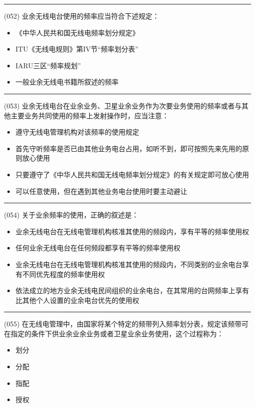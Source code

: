 \documentclass[twocolumn]{ctexart}  %
\begin{document}
\noindent\rule{0.5\textwidth}{1pt}
\heiti (052) 业余无线电台使用的频率应当符合下述规定： \songti {\color{gray} [LK0047] }
\begin{itemize}
	\item  《中华人民共和国无线电频率划分规定》
	\item  ITU《无线电规则》第IV节“频率划分表”
	\item  IARU三区“频率规划”
	\item  一般业余无线电书籍所叙述的频率
\end{itemize}


\noindent\rule{0.5\textwidth}{1pt}
\heiti (053) 业余无线电台在业余业务、卫星业余业务作为次要业务使用的频率或者与其他主要业务共同使用的频率上发射操作时，应当注意： \songti {\color{gray} [LK0048] }
\begin{itemize}
	\item  遵守无线电管理机构对该频率的使用规定
	\item  首先守听频率是否已由其他业务电台占用，如听不到，即可按照先来先用的原则放心使用
	\item  只要遵守了《中华人民共和国无线电频率划分规定》的有关规定即可放心使用
	\item  可以任意使用，但在遇到其他业务电台使用时要主动避让
\end{itemize}


\noindent\rule{0.5\textwidth}{1pt}
\heiti (054) 关于业余频率的使用，正确的叙述是： \songti {\color{gray} [LK0049] }
\begin{itemize}
	\item  业余无线电台在无线电管理机构核准其使用的频段内，享有平等的频率使用权
	\item  任何业余无线电台在任何频段都享有平等的频率使用权
	\item  业余无线电台在无线电管理机构核准其使用的频段内，不同类别的业余电台享有不同优先程度的频率使用权
	\item  依法成立的地方业余无线电民间组织的业余电台，在其常用的台网频率上享有比其他个人设置的业余电台优先的使用权
\end{itemize}


\noindent\rule{0.5\textwidth}{1pt}
\heiti (055) 在无线电管理中，由国家将某个特定的频带列入频率划分表，规定该频带可在指定的条件下供业余业余业务或者卫星业余业务使用，这个过程称为： \songti {\color{gray} [LK0113] }
\begin{itemize}
	\item  划分
	\item  分配
	\item  指配
	\item  授权
\end{itemize}
\end{document}
